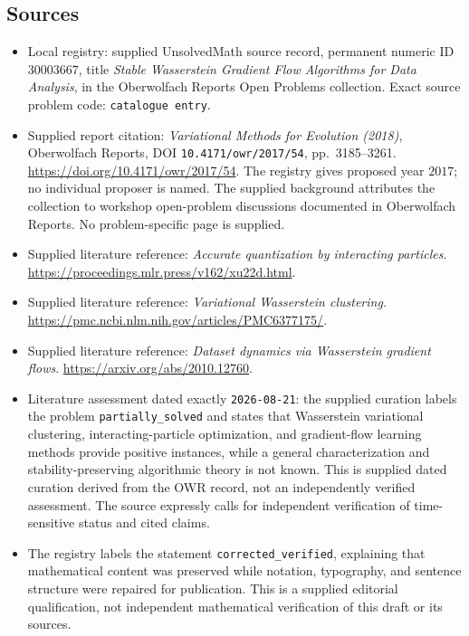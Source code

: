 \documentclass[11pt]{article}
\begin{document}
\subsection{Sources}
\begin{itemize}
\item Local registry: supplied UnsolvedMath source record, permanent numeric ID \(30003667\), title \emph{Stable Wasserstein Gradient Flow Algorithms for Data Analysis}, in the Oberwolfach Reports Open Problems collection. Exact source problem code: \texttt{catalogue entry}.
\item Supplied report citation: \emph{Variational Methods for Evolution (2018)}, Oberwolfach Reports, DOI \texttt{10.4171/owr/2017/54}, pp.~3185--3261. \url{https://doi.org/10.4171/owr/2017/54}. The registry gives proposed year \(2017\); no individual proposer is named. The supplied background attributes the collection to workshop open-problem discussions documented in Oberwolfach Reports. No problem-specific page is supplied.
\item Supplied literature reference: \emph{Accurate quantization by interacting particles}. \url{https://proceedings.mlr.press/v162/xu22d.html}.
\item Supplied literature reference: \emph{Variational Wasserstein clustering}. \url{https://pmc.ncbi.nlm.nih.gov/articles/PMC6377175/}.
\item Supplied literature reference: \emph{Dataset dynamics via Wasserstein gradient flows}. \url{https://arxiv.org/abs/2010.12760}.
\item Literature assessment dated exactly \texttt{2026-08-21}: the supplied curation labels the problem \texttt{partially\_solved} and states that Wasserstein variational clustering, interacting-particle optimization, and gradient-flow learning methods provide positive instances, while a general characterization and stability-preserving algorithmic theory is not known. This is supplied dated curation derived from the OWR record, not an independently verified assessment. The source expressly calls for independent verification of time-sensitive status and cited claims.
\item The registry labels the statement \texttt{corrected\_verified}, explaining that mathematical content was preserved while notation, typography, and sentence structure were repaired for publication. This is a supplied editorial qualification, not independent mathematical verification of this draft or its sources.
\end{itemize}
\end{document}
